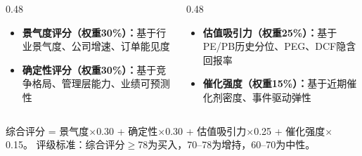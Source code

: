 \begin{table}[htbp]
\begin{tcolorbox}[colback=gray!5, colframe=gray!30, boxrule=0.5pt,
      left=6pt, right=6pt, top=4pt, bottom=4pt]
    \scriptsize
    \begin{columns}[T]
      \begin{column}{0.48\textwidth}
        \begin{itemize}[leftmargin=*, itemsep=0pt, parsep=0pt, topsep=0pt]
          \item \textbf{景气度评分（权重30\%）：}基于行业景气度、公司增速、订单能见度
          \item \textbf{确定性评分（权重30\%）：}基于竞争格局、管理层能力、业绩可预测性
        \end{itemize}
      \end{column}
      \begin{column}{0.48\textwidth}
        \begin{itemize}[leftmargin=*, itemsep=0pt, parsep=0pt, topsep=0pt]
          \item \textbf{估值吸引力（权重25\%）：}基于PE/PB历史分位、PEG、DCF隐含回报率
          \item \textbf{催化强度（权重15\%）：}基于近期催化剂密度、事件驱动弹性
        \end{itemize}
      \end{column}
    \end{columns}
    \vspace{0.3em}
    \scriptsize 综合评分 = 景气度$\times$0.30 + 确定性$\times$0.30 + 估值吸引力$\times$0.25 + 催化强度$\times$0.15。
    评级标准：综合评分$\geq$78为买入，70--78为增持，60--70为中性。
  \end{tcolorbox}
\end{table}
